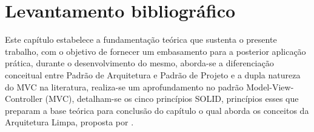 \chapter{Levantamento bibliográfico}
\thispagestyle{headings}

    \par Este capítulo estabelece a fundamentação teórica que sustenta o presente trabalho, com o objetivo de fornecer um embasamento para a posterior aplicação prática, durante o desenvolvimento do mesmo, aborda-se a diferenciação conceitual entre Padrão de Arquitetura e Padrão de Projeto e a dupla natureza do MVC na literatura, realiza-se um aprofundamento no padrão Model-View-Controller (MVC), detalham-se os cinco princípios SOLID, princípios esses que preparam a base teórica para conclusão do capítulo o qual aborda os conceitos da Arquitetura Limpa, proposta por \cite{livro:martin:cleanarch}.
    
    
    
    
    
    
    
    
    
    

    
    
    
    

    

    